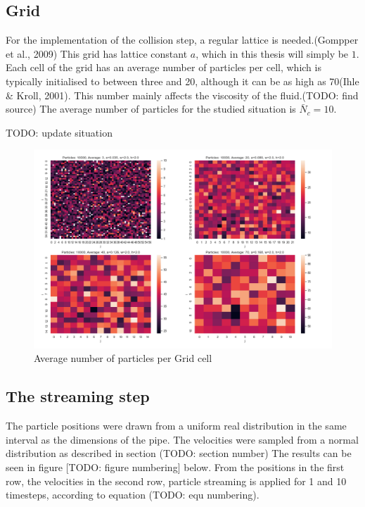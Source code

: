 \documentclass[
]{article}
\begin{document}
\hypertarget{grid}{%
\subsection{Grid}\label{grid}}

For the implementation of the collision step, a regular lattice is
needed.(Gompper et al., 2009) This grid has lattice constant \(a\),
which in this thesis will simply be \(1\). Each cell of the grid has an
average number of particles per cell, which is typically initialised to
between three and 20, although it can be as high as 70(Ihle \& Kroll,
2001). This number mainly affects the viscosity of the fluid.(TODO: find
source) The average number of particles for the studied situation is
\(\bar N_c = 10\).

TODO: update situation

\begin{figure}
\centering
\includegraphics{Assets/average_grid_particles.png}
\caption{Average number of particles per Grid cell}
\end{figure}

\hypertarget{the-streaming-step-2}{%
\subsection{The streaming step}\label{the-streaming-step-2}}

The particle positions were drawn from a uniform real distribution in
the same interval as the dimensions of the pipe. The velocities were
sampled from a normal distribution as described in section (TODO:
section number) The results can be seen in figure {[}TODO: figure
numbering{]} below. From the positions in the first row, the velocities
in the second row, particle streaming is applied for 1 and 10 timesteps,
according to equation (TODO: equ numbering).
\end{document}
